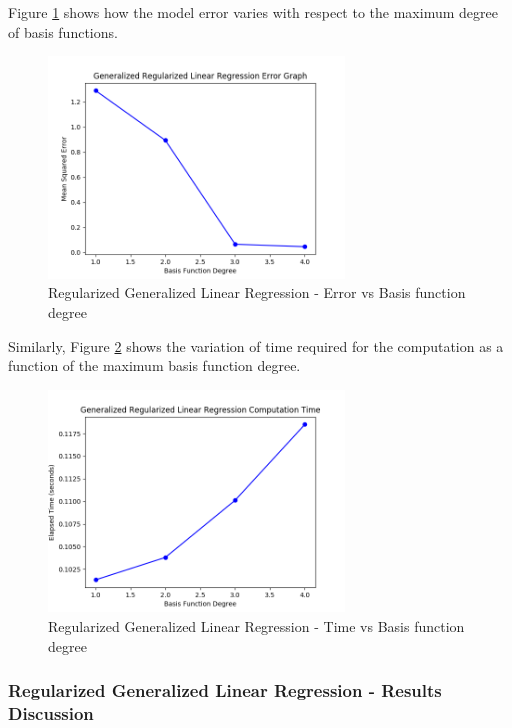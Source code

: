 \documentclass[parskip=full]{scrartcl}
\begin{document}
        Figure \ref{fig:rglg_err_v_deg} shows how the model error varies with respect to the maximum degree of basis functions. 

        \begin{figure}[ht]
            \centering
            \includegraphics[width=0.7\textwidth]{3a_degree_vs_error.png}
            \caption{Regularized Generalized Linear Regression - Error vs Basis function degree}
            \label{fig:rglg_err_v_deg}
        \end{figure}

        Similarly, Figure \ref{fig:rglg_time_v_deg} shows the variation of time required for the computation as a function of the maximum basis function degree. 

        \begin{figure}[ht]
            \centering
            \includegraphics[width=0.7\textwidth]{3a_degree_vs_time.png}
            \caption{Regularized Generalized Linear Regression - Time vs Basis function degree}
            \label{fig:rglg_time_v_deg}
        \end{figure}

        \subsubsection*{Regularized Generalized Linear Regression - Results Discussion} %
        \label{ssub:regularized_generalized_linear_regression_results_discussion}
\end{document}
